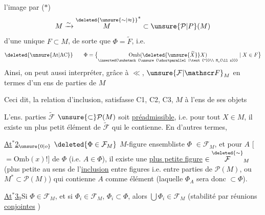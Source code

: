 l'image par  ($*$)
\[
 M\xrightarrow{\sim}\overset{\deleted{\unsure{\sim|\approx}}}{M}^{*}\subset\unsure{\mathcal P|P}(M)
\]
d'une unique  $F\subset M$, de sorte que $\Phi=\widetilde F$, i.e.
\[
 \deleted{\unsure{\mathrm{At}|\mathrm{AC}}}\qquad
 \Phi=\bigl\{\underset{\inserted{\substack{\unsure{\shortparallel|\text{''}}\\ M_{\ll x}}}}
 {\mathrm{Omb}(\deleted{\unsure{\widetilde X}}X)}\mid X\in F\bigr\}
\]
Ainsi, on peut aussi interpréter, grâce à $\ll$, $\unsure{\mathcal F|\mathscr F}_M$ en termes d'un  ens de parties  de $M$

Ceci dit,  
    la relation d'inclusion, satisfasse C1, C2, C3,
  $M$  à l'ens de ses objets 

\quad {} L'ens.  parties $\widetilde{\mathcal F}$  $\unsure{\subset}\mathcal P(M)$ soit \uline{préadmissible}, i.e. pour tout $X\in M$, il existe un plus petit élément de $\widetilde{\mathcal F}$ qui le contienne. En d'autres termes,

\uline{At$^{*}$2}$_{\unsure{0|o}}$\quad
\margin{\rule{0.45pt}{4\baselineskip}}
  $\deleted{\Phi\in\mathcal F_M}$ $M$-figure ensembliste $\Phi$  $\in\mathcal F_M$, et pour $A$ [$=\mathrm{Omb}(x)$!]   de $\Phi$ (i.e. $A\in\Phi$), il existe une \uline{plus petite figure}   $\in\overset{\deleted{\sim}}{\mathcal F}_M$
(plus petite au sens de l'\uline{inclusion} \deleted{\unsure{)}} entre figures i.e. entre parties de $\mathcal P(M)$, ou  $M^{*}\subset\mathcal P(M)$) qui contienne $A$ comme élément (laquelle $\Phi_A$ sera donc $\subset\Phi$).

\uline{At$^{*}$3}$_0$\quad Si $\Phi\in\mathcal F_M$, et si  $\Phi_i\in\mathcal F_M$, $\Phi_i\subset\Phi$, alors $\bigcup\Phi_i\in\mathcal F_M$ (stabilité par réunions \uline{conjointes} )
